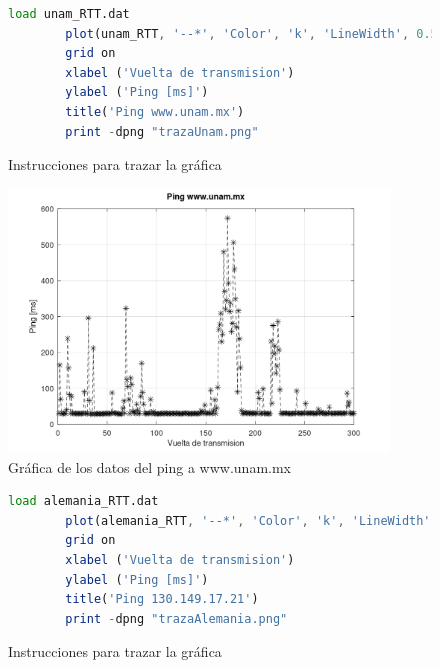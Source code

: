 \begin{figure}[H] 
    \centering 
    \begin{lstlisting}[frame=single, breaklines=true, basicstyle=\footnotesize\ttfamily, breakatwhitespace=false, columns=flexible, tabsize=2, showstringspaces=false, language=Octave] 
        load unam_RTT.dat 
        plot(unam_RTT, '--*', 'Color', 'k', 'LineWidth', 0.5, 'MarkerSize', 8) 
        grid on 
        xlabel ('Vuelta de transmision') 
        ylabel ('Ping [ms]') 
        title('Ping www.unam.mx') 
        print -dpng "trazaUnam.png" 
    \end{lstlisting} 
    \caption{Instrucciones para trazar la gr\'afica} 
    \label{fig:unamOctave} 
\end{figure}

\begin{figure}[H]
	\centering
	\includegraphics[width=0.90\textwidth]{img/trazaUnam.png}
	\caption{Gr\'afica de los datos del ping a www.unam.mx}
	\label{fig:unamGraph}
\end{figure}

\newpage

\begin{figure}[H] 
    \centering 
    \begin{lstlisting}[frame=single, breaklines=true, basicstyle=\footnotesize\ttfamily, breakatwhitespace=false, columns=flexible, tabsize=2, showstringspaces=false, language=Octave] 
        load alemania_RTT.dat 
        plot(alemania_RTT, '--*', 'Color', 'k', 'LineWidth', 0.5, 'MarkerSize', 8) 
        grid on 
        xlabel ('Vuelta de transmision') 
        ylabel ('Ping [ms]') 
        title('Ping 130.149.17.21') 
        print -dpng "trazaAlemania.png" 
    \end{lstlisting} 
    \caption{Instrucciones para trazar la gr\'afica} 
    \label{fig:alemaniaOctave} 
\end{figure}

